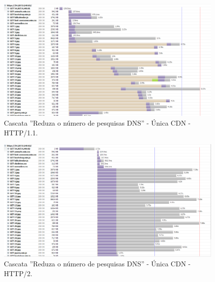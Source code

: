 \begin{apendicesenv}
\begin{landscape}
	\begin{figure}[!htb]
    	\centering
	    \caption{Cascata ''Reduza o número de pesquisas DNS'' - Única CDN - HTTP/1.1.}
	    \includegraphics[width=1.5\textwidth]{./04-figuras/cascatas/single_http11}
	\end{figure}
\end{landscape}

\begin{landscape}
	\begin{figure}[!htb]
    	\centering
	    \caption{Cascata ''Reduza o número de pesquisas DNS'' - Única CDN - HTTP/2.}
	    \includegraphics[width=1.5\textwidth]{./04-figuras/cascatas/single_http2}
	\end{figure}
\end{landscape}


\end{apendicesenv}
